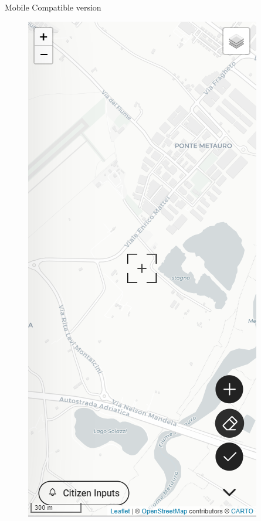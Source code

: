 Mobile Compatible version
\begin{figure}[H]
    \centering
    \begin{minipage}{0.24\textwidth}
        \centering
        \includegraphics[width=\textwidth]{res/web/mobile-app}

\end{minipage}
\end{figure}
